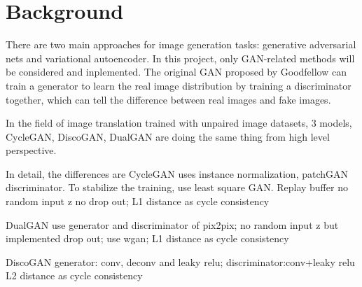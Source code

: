\chapter{Background}\label{Ch:Background}
There are two main approaches for image generation tasks: generative adversarial nets and variational autoencoder. In this project, only GAN-related methods will be considered and inplemented.
The original GAN proposed by Goodfellow can train a generator to learn the real image distribution by training a discriminator together, which can tell the difference between real images and fake images.

In the field of image translation trained with unpaired image datasets, 3 models, CycleGAN, DiscoGAN, DualGAN are doing the same thing %
from high level perspective.

In detail, the differences are
CycleGAN uses instance normalization, patchGAN discriminator. To stabilize the training, use least square GAN. Replay buffer
              no random input z no drop out; L1 distance as cycle consistency

DualGAN use generator and discriminator of pix2pix; no random input z but implemented drop out; use wgan;
             L1 distance as cycle consistency

DiscoGAN generator: conv, deconv and leaky relu; discriminator:conv+leaky relu  L2 distance as cycle consistency






